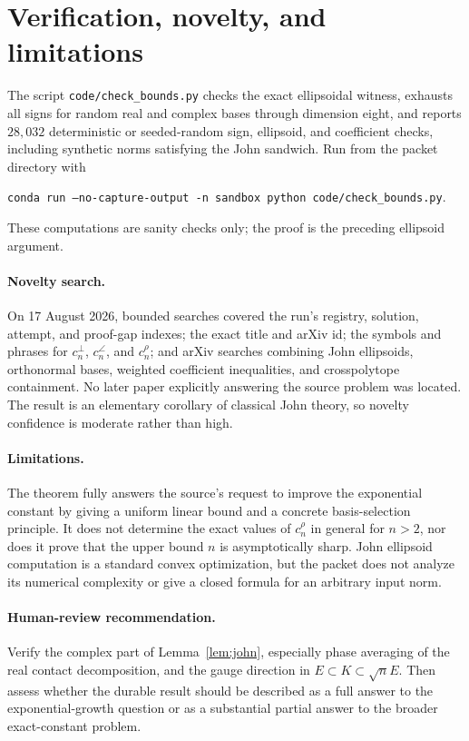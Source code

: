 \documentclass[11pt]{article}
\begin{document}
\section{Verification, novelty, and limitations}

The script \texttt{code/check\_bounds.py} checks the exact ellipsoidal
witness, exhausts all signs for random real and complex bases through
dimension eight, and reports $28{,}032$ deterministic or seeded-random sign,
ellipsoid, and coefficient checks, including synthetic norms satisfying the
John sandwich.  Run from the
packet directory with
\begin{center}
\texttt{conda run --no-capture-output -n sandbox python code/check\_bounds.py}.
\end{center}
These computations are sanity checks only; the proof is the preceding
ellipsoid argument.

\paragraph{Novelty search.}
On 17 August 2026, bounded searches covered the run's registry, solution,
attempt, and proof-gap indexes; the exact title and arXiv id; the symbols and
phrases for $c_n^\perp$, $c_n^\angle$, and $c_n^\rho$; and arXiv searches
combining John ellipsoids, orthonormal bases, weighted coefficient
inequalities, and crosspolytope containment.  No later paper explicitly
answering the source problem was located.  The result is an elementary
corollary of classical John theory, so novelty confidence is moderate rather
than high.

\paragraph{Limitations.}
The theorem fully answers the source's request to improve the exponential
constant by giving a uniform linear bound and a concrete basis-selection
principle.  It does not determine the exact values of $c_n^\rho$ in general
for $n>2$, nor does it prove that the upper bound $n$ is asymptotically sharp.
John ellipsoid computation is a standard convex optimization, but the packet
does not analyze its numerical complexity or give a closed formula for an
arbitrary input norm.

\paragraph{Human-review recommendation.}
Verify the complex part of Lemma~\ref{lem:john}, especially phase averaging
of the real contact decomposition, and the gauge direction in
$E\subset K\subset\sqrt nE$.  Then assess whether the durable result should
be described as a full answer to the exponential-growth question or as a
substantial partial answer to the broader exact-constant problem.
\end{document}

